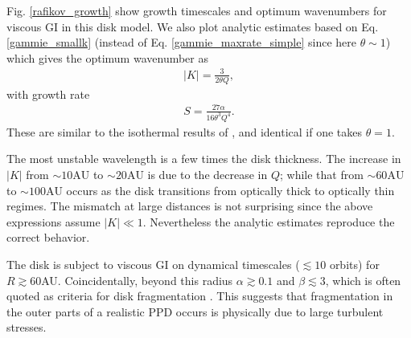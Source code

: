 Fig. \ref{rafikov_growth} show growth timescales and
optimum wavenumbers for viscous GI in this disk model.  
We also plot analytic estimates based on Eq. \ref{gammie_smallk} (instead of
Eq. \ref{gammie_maxrate_simple} since here $\theta\sim 1$) 
which gives the optimum wavenumber as
\begin{align}
  |K| = \frac{3}{2\theta Q},
\end{align}
with growth rate
\begin{align} 
  S = \frac{27\alpha}{16\theta^3Q^4}. 
\end{align}
These are similar to the isothermal results of
\citet[][their Eq. 19 and 21, respectively]{sterzik95}, and identical if one
takes $\theta=1$. 
 
The most unstable wavelength is a few times the disk thickness. The
increase in $|K|$ from $\sim 10\mathrm{AU}$ to $\sim 20\mathrm{AU}$ is
due to the decrease in $Q$; while that from $\sim 60\mathrm{AU}$ to
$\sim 100\mathrm{AU}$ occurs as the disk transitions from optically
thick to optically thin regimes. The mismatch at large distances is
not surprising since the above expressions assume $|K|\ll
1$. Nevertheless the analytic estimates reproduce the correct
behavior.  

The disk is subject to viscous GI on dynamical timescales ($\lesssim
10$ orbits) for $R\gtrsim60$AU. Coincidentally, beyond this radius
$\alpha\gtrsim 0.1$ and $\beta\lesssim 3$, which is often quoted as 
criteria for disk fragmentation \citep[e.g.][]{rafikov15}. 
This suggests that fragmentation in the outer parts of a realistic PPD
occurs is physically due to large turbulent stresses. 





